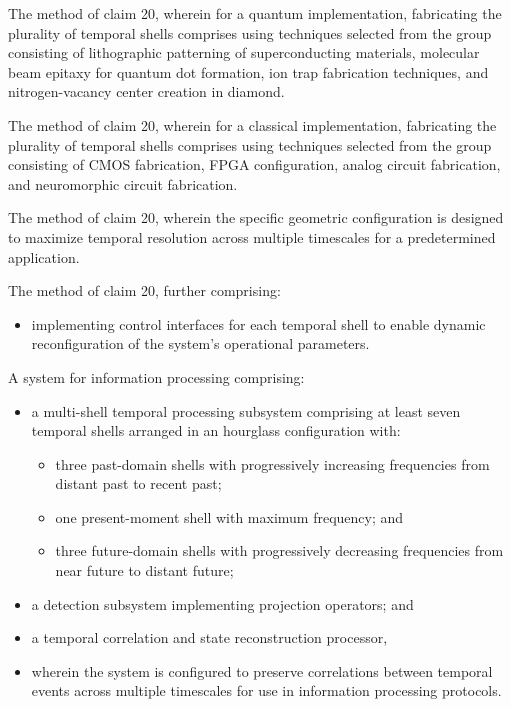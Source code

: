 \documentclass[12pt,letterpaper]{article}
\begin{document}
\begin{patentclaims}
    \item The method of claim 20, wherein for a quantum implementation, fabricating the plurality of temporal shells comprises using techniques selected from the group consisting of lithographic patterning of superconducting materials, molecular beam epitaxy for quantum dot formation, ion trap fabrication techniques, and nitrogen-vacancy center creation in diamond.
    
    \item The method of claim 20, wherein for a classical implementation, fabricating the plurality of temporal shells comprises using techniques selected from the group consisting of CMOS fabrication, FPGA configuration, analog circuit fabrication, and neuromorphic circuit fabrication.
    
    \item The method of claim 20, wherein the specific geometric configuration is designed to maximize temporal resolution across multiple timescales for a predetermined application.
    
    \item The method of claim 20, further comprising:
    \begin{itemize}[leftmargin=2em]
        \item implementing control interfaces for each temporal shell to enable dynamic reconfiguration of the system's operational parameters.
    \end{itemize}
    
    \item A system for information processing comprising:
    \begin{itemize}[leftmargin=2em]
        \item a multi-shell temporal processing subsystem comprising at least seven temporal shells arranged in an hourglass configuration with:
        \begin{itemize}
            \item three past-domain shells with progressively increasing frequencies from distant past to recent past;
            \item one present-moment shell with maximum frequency; and
            \item three future-domain shells with progressively decreasing frequencies from near future to distant future;
        \end{itemize}
        \item a detection subsystem implementing projection operators; and
        \item a temporal correlation and state reconstruction processor,
        \item wherein the system is configured to preserve correlations between temporal events across multiple timescales for use in information processing protocols.
    \end{itemize}
\end{patentclaims}
\end{document}
